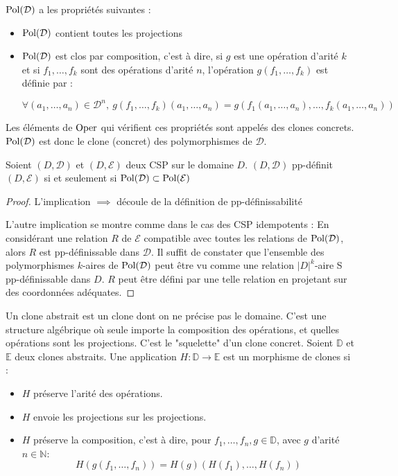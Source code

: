 \begin{prop}
    $\text{Pol}(\mathcal{D})$ a les propriétés suivantes :
    \begin{itemize}
    	\item $\text{Pol}(\mathcal{D})$ contient toutes les projections
        \item $\text{Pol}(\mathcal{D})$ est clos par composition, c'est à dire, si
            $g$ est une opération d'arité $k$ et si $f_1,\dots,f_k$ sont des
            opérations d'arité $n$, l'opération $g(f_1,\dots,f_k)$ est définie
            par :

            $$ \forall (a_1,\dots,a_n) \in \mathcal{D}^n,\
            g(f_1,\dots,f_k)(a_1,\dots,a_n) =
            g(f_1(a_1,\dots,a_n),\dots,f_k(a_1,\dots,a_n)) $$
    \end{itemize}
    Les éléments de $\text{Oper}$ qui vérifient ces propriétés sont appelés des
    clones concrets. $\text{Pol}(\mathcal{D})$ est donc le clone (concret) des
    polymorphismes de $\mathcal{D}$.
\end{prop}

\begin{theo}{}
    Soient $(D,\mathcal{D})$ et $(D,\mathcal{E})$ deux CSP sur le domaine $D$.
    $(D,\mathcal{D})$ pp-définit $(D,\mathcal{E})$ si et seulement si
    $\text{Pol}(\mathcal{D}) \subset \text{Pol}(\mathcal{E})$
\end{theo}

\begin{proof}
    L'implication $\implies$ découle de la définition de pp-définissabilité

    L'autre implication se montre comme dans le cas des CSP idempotents : En
    considérant une relation $R$ de $\mathcal{E}$ compatible avec toutes les
    relations de $\text{Pol}(\mathcal{D})$, alors $R$ est pp-définissable dans
    $\mathcal{D}$. Il suffit de constater que l'ensemble des polymorphismes
    $k$-aires de $\text{Pol}(\mathcal{D})$ peut être vu comme une relation
    $|D|^k$-aire S pp-définissable dans $D$. $R$ peut être défini par une telle
    relation en projetant sur des coordonnées adéquates.
\end{proof}

\begin{defi}{}
    Un clone abstrait est un clone dont on ne précise pas le domaine. C'est une
    structure algébrique où seule importe la composition des opérations, et
    quelles opérations sont les projections. C'est le "squelette" d'un clone
    concret.  Soient $\mathbb{D}$ et $\mathbb{E}$ deux clones abstraits. Une
    application $H : \mathbb{D} \rightarrow \mathbb{E}$ est un morphisme de
    clones si :
    \begin{itemize}
    	\item $H$ préserve l'arité des opérations.
    	\item $H$ envoie les projections sur les projections.
        \item $H$ préserve la composition, c'est à dire, pour $f_1,\dots,f_n,g
            \in \mathbb{D}$, avec $g$ d'arité $n \in \mathbb{N}$:
            $$H(g(f_1,\dots,f_n)) = H(g)(H(f_1),\dots,H(f_n)) $$
    \end{itemize}
\end{defi}

